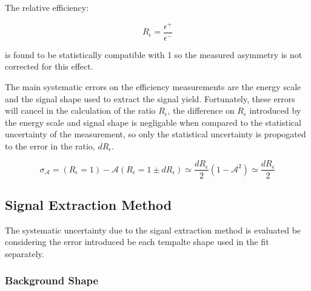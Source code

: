 The relative efficiency: 

\begin{equation}
R_\epsilon  =  \frac{\epsilon^+}{\epsilon^-}
\end{equation}

is found to be statistically compatible with 1 so the measured asymmetry is not
corrected for this effect.

The main systematic errors on the efficiency measurements are the energy scale
and the signal shape used to extract the signal yield. Fortunately, these
errors will cancel in the calculation of the ratio $R_\epsilon$, the difference
on  $R_\epsilon$ introduced by the energy scale and signal shape is negligable
when compared to the statistical uncertainty of the measurement, so only the
statistical uncertainty is propogated to the error in the ratio,
$dR_\epsilon$.

\begin{equation}
  \label{eq:releff}
  \sigma_{\mathcal{A}} =\mathcal{}(R_\epsilon=1) - \mathcal{A}(R_\epsilon=1\pm dR_\epsilon)  \simeq \frac{dR_\epsilon}{2}(1-\mathcal{A}^2)\simeq \frac{dR_\epsilon}{2}
\end{equation}


\subsection{Signal Extraction Method}

The systematic uncertainty due to the siganl extraction method is evaluated be
considering the error introduced be each \ETm tempalte shape used in the fit
separately.

\subsubsection{Background \ETm Shape}

